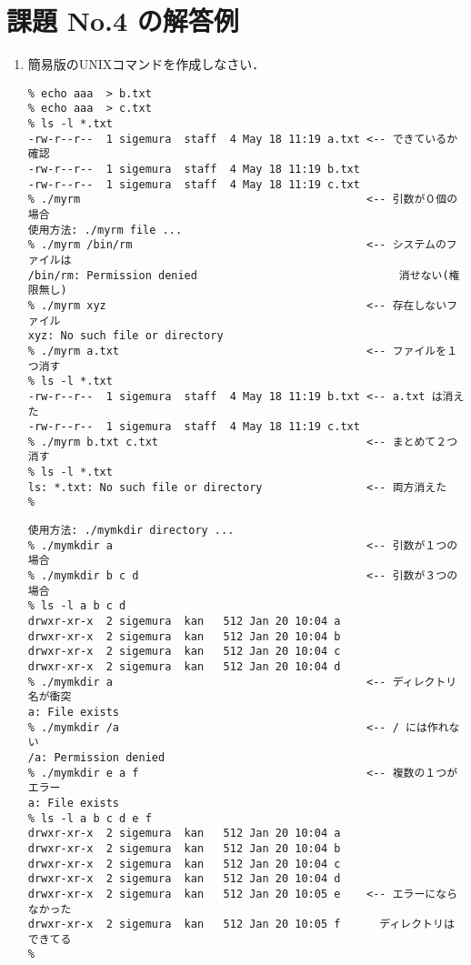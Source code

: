 \documentclass[a4j,twcolumn,11pt,nomag]{ltjarticle}      %
\begin{document}
\onecolumn

\section*{課題 No.4 の解答例}
\begin{enumerate}
\item 簡易版のUNIXコマンドを作成しなさい．
\begin{lstlisting}[caption=myrmの実行例（動作テスト！！）]
% echo aaa  > a.txt                                 <-- 実験用ファイルを作る
% echo aaa  > b.txt
% echo aaa  > c.txt
% ls -l *.txt
-rw-r--r--  1 sigemura  staff  4 May 18 11:19 a.txt <-- できているか確認
-rw-r--r--  1 sigemura  staff  4 May 18 11:19 b.txt
-rw-r--r--  1 sigemura  staff  4 May 18 11:19 c.txt
% ./myrm                                            <-- 引数が０個の場合
使用方法: ./myrm file ...
% ./myrm /bin/rm                                    <-- システムのファイルは
/bin/rm: Permission denied                               消せない(権限無し)
% ./myrm xyz                                        <-- 存在しないファイル
xyz: No such file or directory
% ./myrm a.txt                                      <-- ファイルを１つ消す
% ls -l *.txt
-rw-r--r--  1 sigemura  staff  4 May 18 11:19 b.txt <-- a.txt は消えた
-rw-r--r--  1 sigemura  staff  4 May 18 11:19 c.txt
% ./myrm b.txt c.txt                                <-- まとめて２つ消す
% ls -l *.txt
ls: *.txt: No such file or directory                <-- 両方消えた
% 
\end{lstlisting}

\begin{lstlisting}[caption=mymkdirの実行例（動作テスト！！）]
% ./mymkdir                                         <-- 引数がない場合
使用方法: ./mymkdir directory ...
% ./mymkdir a                                       <-- 引数が１つの場合
% ./mymkdir b c d                                   <-- 引数が３つの場合
% ls -l a b c d
drwxr-xr-x  2 sigemura  kan   512 Jan 20 10:04 a
drwxr-xr-x  2 sigemura  kan   512 Jan 20 10:04 b
drwxr-xr-x  2 sigemura  kan   512 Jan 20 10:04 c
drwxr-xr-x  2 sigemura  kan   512 Jan 20 10:04 d
% ./mymkdir a                                       <-- ディレクトリ名が衝突
a: File exists
% ./mymkdir /a                                      <-- / には作れない
/a: Permission denied
% ./mymkdir e a f                                   <-- 複数の１つがエラー
a: File exists
% ls -l a b c d e f
drwxr-xr-x  2 sigemura  kan   512 Jan 20 10:04 a
drwxr-xr-x  2 sigemura  kan   512 Jan 20 10:04 b
drwxr-xr-x  2 sigemura  kan   512 Jan 20 10:04 c
drwxr-xr-x  2 sigemura  kan   512 Jan 20 10:04 d
drwxr-xr-x  2 sigemura  kan   512 Jan 20 10:05 e    <-- エラーにならなかった
drwxr-xr-x  2 sigemura  kan   512 Jan 20 10:05 f      ディレクトリはできてる
%
\end{lstlisting}


\end{enumerate}
\end{document}
